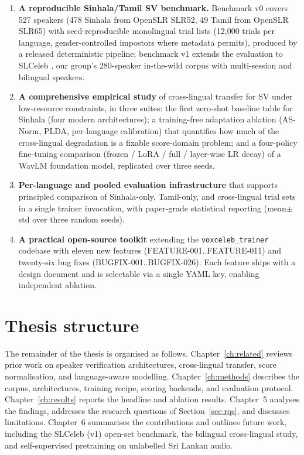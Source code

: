 \begin{enumerate}
    \item \textbf{A reproducible Sinhala/Tamil SV benchmark.}
    Benchmark v0 covers 527 speakers (478 Sinhala from OpenSLR SLR52,
    49 Tamil from OpenSLR SLR65) with seed-reproducible monolingual
    trial lists (12{,}000 trials per language, gender-controlled
    impostors where metadata permits), produced by a released
    deterministic pipeline; benchmark v1 extends the evaluation to
    SLCeleb \cite{slceleb2025}, our group's 280-speaker in-the-wild
    corpus with multi-session and bilingual speakers.
    \item \textbf{A comprehensive empirical study} of cross-lingual
    transfer for SV under low-resource constraints, in three suites:
    the first zero-shot baseline table for Sinhala (four modern
    architectures); a training-free adaptation ablation (AS-Norm,
    PLDA, per-language calibration) that quantifies how much of the
    cross-lingual degradation is a fixable score-domain problem; and
    a four-policy fine-tuning comparison (frozen / LoRA / full /
    layer-wise LR decay) of a WavLM foundation model, replicated
    over three seeds.
    \item \textbf{Per-language and pooled evaluation infrastructure}
    that supports principled comparison of Sinhala-only,
    Tamil-only, and cross-lingual trial sets in a single trainer
    invocation, with paper-grade statistical reporting
    (mean$\pm$std over three random seeds).
    \item \textbf{A practical open-source toolkit} extending the
    \texttt{voxceleb\_trainer} codebase \cite{slspv2026repo} with
    eleven new features (FEATURE-001..FEATURE-011) and twenty-six
    bug fixes (BUGFIX-001..BUGFIX-026). Each feature ships with a
    design document and is selectable via a single YAML key, enabling
    independent ablation.
\end{enumerate}

\section{Thesis structure}
\label{sec:structure}

The remainder of the thesis is organised as follows.
Chapter~\ref{ch:related} reviews prior work on speaker verification
architectures, cross-lingual transfer, score normalisation, and
language-aware modelling.
Chapter~\ref{ch:methods} describes the corpus, architectures, training
recipe, scoring backends, and evaluation protocol.
Chapter~\ref{ch:results} reports the headline and ablation results.
Chapter~5 analyses the findings, addresses the
research questions of Section~\ref{sec:rqs}, and discusses limitations.
Chapter~6 summarises the contributions and outlines
future work, including the SLCeleb (v1) open-set benchmark, the
bilingual cross-lingual study, and self-supervised pretraining on
unlabelled Sri Lankan audio.
